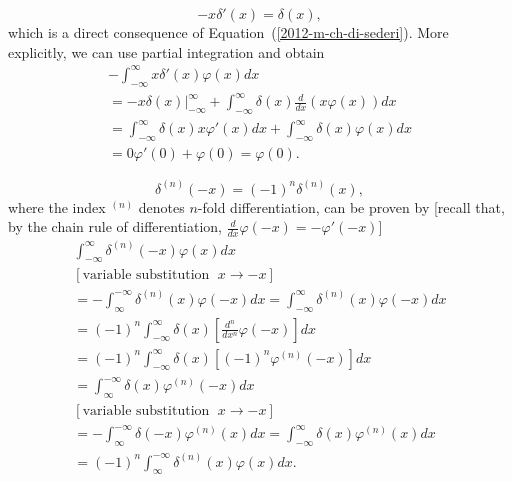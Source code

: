  \begin{equation}
 -x\delta '(x)=\delta (x),
 \end{equation}
which is a direct consequence of Equation~(\ref{2012-m-ch-di-sederi}).
{\color{OliveGreen}
\bproof
More explicitly, we can use partial integration and obtain
 \begin{equation}
 \begin{split}
-\int _{-\infty}^\infty x \delta' (x)  \varphi (x)  dx  \\
 =  - \left. x \delta (x)\right|_{-\infty}^\infty  + \int _{-\infty}^\infty \delta (x)
\frac{d}{dx}\left(x \varphi (x)\right)dx\\
 =
\int _{-\infty}^\infty \delta (x)
x \varphi' (x)  dx
+
\int _{-\infty}^\infty \delta (x)
\varphi (x) dx\\
 =
0 \varphi' (0)  +
\varphi (0)= \varphi (0).
 \end{split}
 \end{equation}
\eproof
}

 \begin{equation}
 \delta^{(n)}(-x) =(-1)^n\delta^{(n)}(x)
,
 \end{equation}
where the index $^{(n)}$ denotes $n$-fold differentiation,
can be proven by
[recall that, by the chain rule of differentiation, $\frac{d}{dx} \varphi (-x)  = - \varphi' (-x)$]
{\color{OliveGreen}
\bproof
 \begin{equation}
 \begin{split}
\int _{-\infty}^\infty \delta^{(n)} (-x)  \varphi (x)  dx  \\
[\textrm{variable substitution }\; x \rightarrow -x]\\
=
-\int _\infty^{-\infty} \delta^{(n)} (x)  \varphi (-x) dx
=
\int _{-\infty}^\infty \delta^{(n)} (x)  \varphi (-x) dx \\
 =
(-1)^n \int _{-\infty}^\infty \delta (x) \left[ \frac{d^n}{dx^n}  \varphi  (-x)\right] dx \\
 =
(-1)^n \int _{-\infty}^\infty \delta (x) \left[(-1)^n  \varphi^{(n)} (-x)\right] dx \\
 =
\int _\infty^{-\infty} \delta (x) \varphi^{(n)} (-x) dx \\
[\textrm{variable substitution }\; x \rightarrow -x]\\
=
-\int _\infty^{-\infty} \delta (-x) \varphi^{(n)} (x) dx
=
\int  _{-\infty}^\infty \delta (x) \varphi^{(n)} (x) dx \\
=
(-1)^n\int _\infty^{-\infty} \delta^{(n)} (x) \varphi (x) dx   .
 \end{split}
 \end{equation}
\eproof
}


